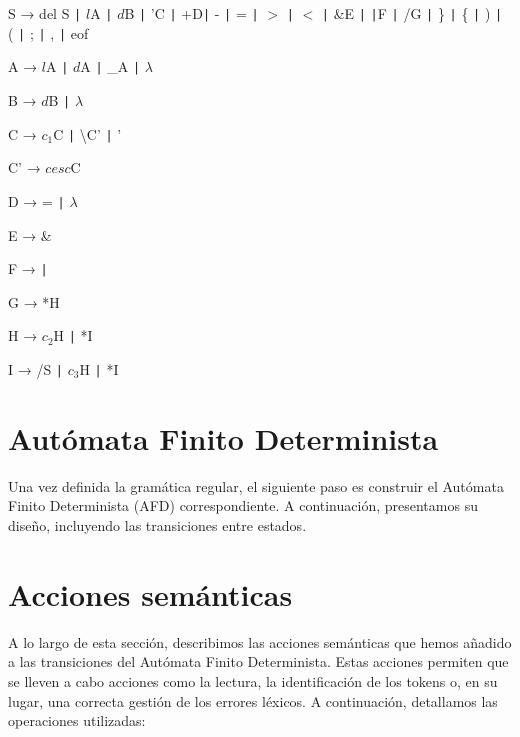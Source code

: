 \documentclass{article}
\begin{document}
\begin{tcolorbox}[title=Gramática Regular]
    \hspace{0.5cm} S → del S \texttt{|} $l$A \texttt{|} $d$B \texttt{|} 'C \texttt{|} +D\texttt{|} - \texttt{|} = \texttt{|} \(>\) \texttt{|} \(<\) \texttt{|} \&E \texttt{|} \texttt{|}F \texttt{|} /G \texttt{|} \} \texttt{|} \{ \texttt{|} ) \texttt{|} ( \texttt{|} ; \texttt{|} , \texttt{|} eof
    
    \hspace{0.5cm} A → $l$A \texttt{|} $d$A \texttt{|} \_A \texttt{|} \( \lambda \)
    
    \hspace{0.5cm} B → $d$B \texttt{|} \( \lambda \)
    
    \hspace{0.5cm} C → $c_1$C \texttt{|} \textbackslash C' \texttt{|} '
    
    \hspace{0.5cm} C' → $cesc$C
    
    \hspace{0.5cm} D → = \texttt{|} \( \lambda \)
    
    \hspace{0.5cm} E → \&
    
    \hspace{0.5cm} F → \texttt{|}
    
    \hspace{0.5cm} G → *H
    
    \hspace{0.5cm} H → $c_2$H \texttt{|} *I
    
    \hspace{0.5cm} I → /S \texttt{|} $c_3$H \texttt{|} *I
\end{tcolorbox}

\section{Autómata Finito Determinista}
Una vez definida la gramática regular, el siguiente paso es construir el Autómata Finito Determinista (AFD) correspondiente. A continuación, presentamos su diseño, incluyendo las transiciones entre estados.

\vspace{0.1cm}



\section{Acciones semánticas}
A lo largo de esta sección, describimos las acciones semánticas que hemos añadido a las transiciones del Autómata Finito Determinista. Estas acciones permiten que se lleven a cabo acciones como la lectura, la identificación de los tokens o, en su lugar, una correcta gestión de los errores léxicos. A continuación, detallamos las operaciones utilizadas:
\end{document}
